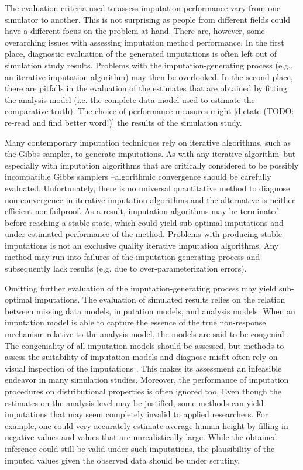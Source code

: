 \documentclass[bimj,fleqn]{w-art}
\begin{document}
The evaluation criteria used to assess imputation performance vary from one simulator to another. This is not surprising as people from different fields could have a different focus on the problem at hand. There are, however, some overarching issues with assessing imputation method performance. In the first place, diagnostic evaluation of the generated imputations is often left out of simulation study results. Problems with the imputation-generating process (e.g., an iterative imputation algorithm) may then be overlooked. In the second place, there are pitfalls in the evaluation of the estimates that are obtained by fitting the analysis model (i.e. the complete data model used to estimate the comparative truth). The choice of performance measures might [dictate (TODO: re-read and find better word!)] the results of the simulation study.

Many contemporary imputation techniques rely on iterative algorithms, such as the Gibbs sampler, to generate imputations. As with any iterative algorithm--but especially with imputation algorithms that are critically considered to be possibly incompatible Gibbs samplers \citep[PIGS,][]{li2012imputing}--algorithmic convergence should be carefully evaluated. Unfortunately, there is no universal quantitative method to diagnose non-convergence in iterative imputation algorithms \citep{zhu15, ober21} and the alternative \citep[visual inspection of the imputation algorithm;][]{buur18} is neither efficient nor failproof. As a result, imputation algorithms may be terminated before reaching a stable state, which could yield sub-optimal imputations and under-estimated performance of the method. Problems with producing stable imputations is not an exclusive quality iterative imputation algorithms. Any method may run into failures of the imputation-generating process and subsequently lack results (e.g. due to over-parameterization errors).

Omitting further evaluation of the imputation-generating process may yield sub-optimal imputations. The evaluation of simulated results relies on the relation between missing data models, imputation models, and analysis models. When an imputation model is able to capture the essence of the true non-response mechanism relative to the analysis model, the models are said to be congenial \citep{meng94}. The congeniality of all imputation models should be assessed, but methods to assess the suitability of imputation models and diagnose misfit often rely on visual inspection of the imputations \citep[see e.g.][]{abayomi2008diagnostics, bond16}. This makes its assessment an infeasible endeavor in many simulation studies. Moreover, the performance of imputation procedures on distributional properties is often ignored too. Even though the estimates on the analysis level may be justified, some methods can yield imputations that may seem completely invalid to applied researchers. For example, one could very accurately estimate average human height by filling in negative values and values that are unrealistically large. While the obtained inference could still be valid under such imputations, the plausibility of the imputed values given the observed data should be under scrutiny.
\end{document}
